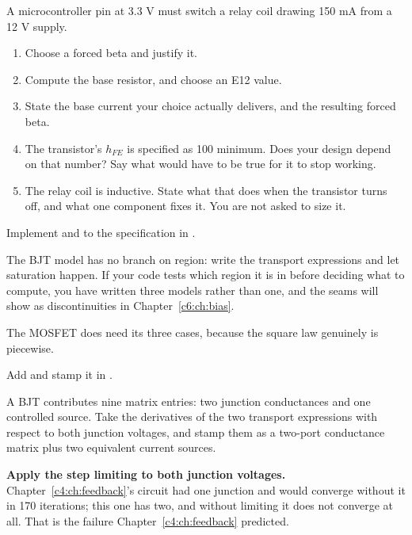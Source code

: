 
\label{c5:ex:5}
A microcontroller pin at 3.3 V must switch a relay coil drawing 150 mA from a 12 V supply.

\begin{enumerate}
  \item Choose a forced beta and justify it.
  \item Compute the base resistor, and choose an E12 value.
  \item State the base current your choice actually delivers, and the resulting forced beta.
  \item The transistor's $h_{FE}$ is specified as 100 minimum. Does your design depend on that number? Say what would have to be true for it to stop working.
  \item The relay coil is inductive. State what that does when the transistor turns off, and what one component fixes it. You are not asked to size it.
\end{enumerate}

\label{c5:ex:6}
Implement  and  to the specification in .

The BJT model has no branch on region: write the transport expressions and let saturation happen. If your code tests which region it is in before deciding what to compute, you have written three models rather than one, and the seams will show as discontinuities in Chapter~\ref{c6:ch:bias}.

The MOSFET does need its three cases, because the square law genuinely is piecewise.

\label{c5:ex:7}
Add  and stamp it in .

A BJT contributes nine matrix entries: two junction conductances and one controlled source. Take the derivatives of the two transport expressions with respect to both junction voltages, and stamp them as a two-port conductance matrix plus two equivalent current sources.

\textbf{Apply the step limiting to both junction voltages.} Chapter~\ref{c4:ch:feedback}'s circuit had one junction and would converge without it in 170 iterations; this one has two, and without limiting it does not converge at all. That is the failure Chapter~\ref{c4:ch:feedback} predicted.

